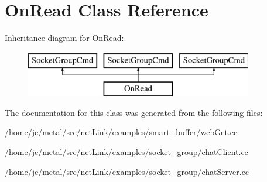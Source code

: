 \hypertarget{classOnRead}{}\section{On\+Read Class Reference}
\label{classOnRead}
Inheritance diagram for On\+Read\+:\begin{figure}[H]
\begin{center}
\leavevmode
\includegraphics[height=2.000000cm]{classOnRead}
\end{center}
\end{figure}


The documentation for this class was generated from the following files\+:\begin{DoxyCompactItemize}
\item 
/home/jc/metal/src/net\+Link/examples/smart\+\_\+buffer/web\+Get.\+cc\item 
/home/jc/metal/src/net\+Link/examples/socket\+\_\+group/chat\+Client.\+cc\item 
/home/jc/metal/src/net\+Link/examples/socket\+\_\+group/chat\+Server.\+cc\end{DoxyCompactItemize}
